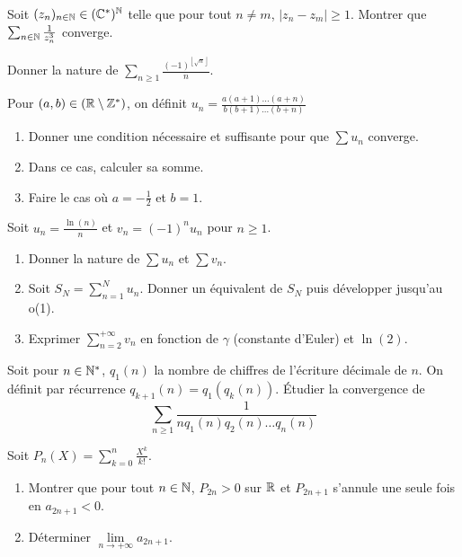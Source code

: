 \documentclass[12pt]{article}
\begin{document}
\begin{exercise}
	Soit $(z_{n})_{n\in\mathbb{N}}\in(\mathbb{C}^{*})^{\mathbb{N}}$ telle que pour tout $n\neq m$, $\vert
	z_{n}-z_{m}\vert\geqslant1$. Montrer que $\sum_{n\in\mathbb{N}}\frac{1}{z_{n}^{3}}$
	converge.
\end{exercise}

\begin{exercise}
	Donner la nature de $\sum_{n\geqslant1}\frac{(-1)^{\left\lfloor\sqrt{n}\right\rfloor}}{n}$.
\end{exercise}

\begin{exercise}
	Pour $(a,b)\in(\mathbb{R}\setminus\mathbb{Z}^{*})$, on définit
	$u_{n}=\frac{a(a+1)\dots(a+n)}{b(b+1)\dots(b+n)}$
	\begin{enumerate}
		\item
		Donner une condition nécessaire et suffisante pour que $\sum u_{n}$
		converge.
		\item
		Dans ce cas, calculer sa somme.
		\item
		Faire le cas où $a=-\frac{1}{2}$ et $b=1$.
	\end{enumerate}
\end{exercise}

\begin{exercise}
	Soit $u_{n}=\frac{\ln(n)}{n}$ et $v_{n}=(-1)^{n}u_{n}$ pour $n\geqslant1$.
	\begin{enumerate}
		\item
		Donner la nature de $\sum u_{n}$ et $\sum v_{n}$.
		\item
		Soit $S_{N}=\sum_{n=1}^{N}u_{n}$. Donner un équivalent de $S_{N}$ puis
		développer jusqu'au o(1).
		\item
		Exprimer $\sum_{n=2}^{+\infty}v_{n}$ en fonction de $\gamma$ (constante
		d'Euler) et $\ln(2)$.
	\end{enumerate}
\end{exercise}

\begin{exercise}
	Soit pour $n\in\mathbb{N}^{*}$, $q_{1}(n)$ la nombre de chiffres de l'écriture
	décimale de $n$. On définit par récurrence $q_{k+1}(n)=q_{1}(q_{k}(n))$.
	Étudier la convergence de 
	$$\sum_{n\geqslant1}\frac{1}{nq_{1}(n)q_{2}(n)\dots q_{n}(n)}$$
\end{exercise}

\begin{exercise}
	Soit $P_{n}(X)=\sum_{k=0}^{n}\frac{X^{k}}{k!}$.
	\begin{enumerate}
		\item
		Montrer que pour tout $n\in\mathbb{N}$, $P_{2n}>0$ sur $\mathbb{R}$ et $P_{2n+1}$ s'annule
		une seule fois en $a_{2n+1}<0$.
		\item
		Déterminer $\lim\limits_{n\to+\infty}a_{2n+1}$.
	\end{enumerate}
\end{exercise}
\end{document}
